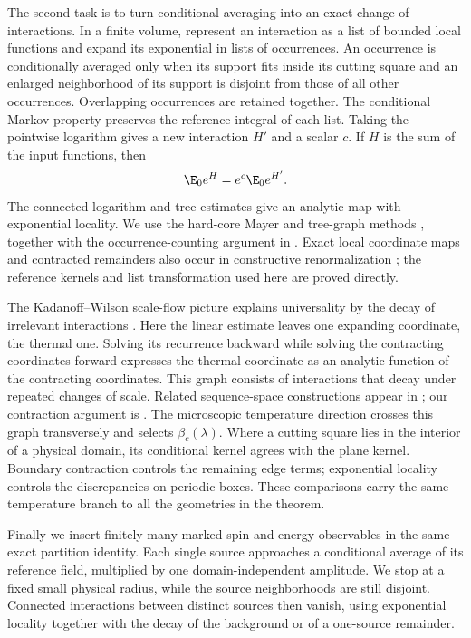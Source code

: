 The second task is to turn conditional averaging into an exact change
of interactions. In a finite volume, represent an interaction as a list of bounded local
functions and expand its exponential in lists of occurrences. An
occurrence is conditionally averaged only when its support fits inside
its cutting square and an enlarged neighborhood of its support is
disjoint from those of all other occurrences. Overlapping occurrences are retained together. The
conditional Markov property preserves the reference integral of each
list. Taking the pointwise logarithm gives a new interaction $H'$ and
a scalar $c$. If $H$ is the sum of the input functions, then
\[
                 \E_0e^H=e^c\E_0e^{H'}.
\]
The connected logarithm and tree estimates give an analytic map with
exponential locality. We use the hard-core Mayer and tree-graph methods
\cite{FP2007,PY2017}, together with the occurrence-counting argument in
. Exact local coordinate maps and contracted
remainders also occur in constructive renormalization
\cite{BS2015}; the reference kernels and list transformation used here
are proved directly.

The Kadanoff--Wilson scale-flow picture explains universality by the
decay of irrelevant interactions \cite{Kadanoff1966,Wilson1971}.
Here the linear estimate leaves one expanding coordinate, the thermal
one. Solving its recurrence backward while solving the contracting
coordinates forward expresses the thermal coordinate as an analytic
function of the contracting coordinates. This graph consists of
interactions that decay under repeated changes of scale. Related
sequence-space constructions appear in \cite{BBS2015}; our contraction argument is
. The microscopic temperature direction crosses
this graph transversely and selects $\beta_c(\lambda)$. Where a cutting
square lies in the interior of a physical domain, its conditional kernel
agrees with the plane kernel. Boundary contraction controls the remaining
edge terms; exponential locality controls the discrepancies on periodic
boxes. These comparisons carry the same temperature branch to all the
geometries in the theorem.

Finally we insert finitely many marked spin and energy observables in
the same exact partition identity. Each single source approaches a
conditional average of its reference field, multiplied by one
domain-independent amplitude. We
stop at a fixed small physical radius, while the source neighborhoods
are still disjoint. Connected interactions between distinct sources
then vanish, using exponential locality together with the decay of the
background or of a one-source remainder.

